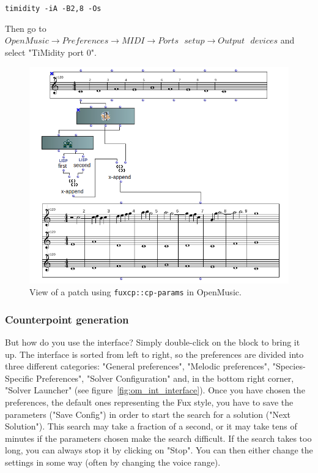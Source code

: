 \texttt{timidity -iA -B2,8 -Os}


Then go to $\mathit{OpenMusic} \to \mathit{Preferences} \to  \mathit{MIDI} \to \mathit{Ports\text{ }setup} \to \mathit{Output\text{ }devices}$ and select "TiMidity port 0".

\begin{figure}[h]
    \centering
    \includegraphics[width=5.2in]{Images/om_ext_interface_mod.png}
    \caption{View of a patch using \texttt{fuxcp::cp-params} in OpenMusic.}
    \label{fig:om_ext_interface_mod}
\end{figure}

\subsubsection*{Counterpoint generation}
But how do you use the interface? Simply double-click on the block to bring it up. The interface is sorted from left to right, so the preferences are divided into three different categories: "General preferences", "Melodic preferences", "Species-Specific Preferences", "Solver Configuration" and, in the bottom right corner, "Solver Launcher" (see figure~\ref{fig:om_int_interface}). Once you have chosen the preferences, the default ones representing the Fux style, you have to save the parameters ("Save Config") in order to start the search for a solution ("Next Solution"). This search may take a fraction of a second, or it may take tens of minutes if the parameters chosen make the search difficult. If the search takes too long, you can always stop it by clicking on "Stop". You can then either change the settings in some way (often by changing the voice range).

